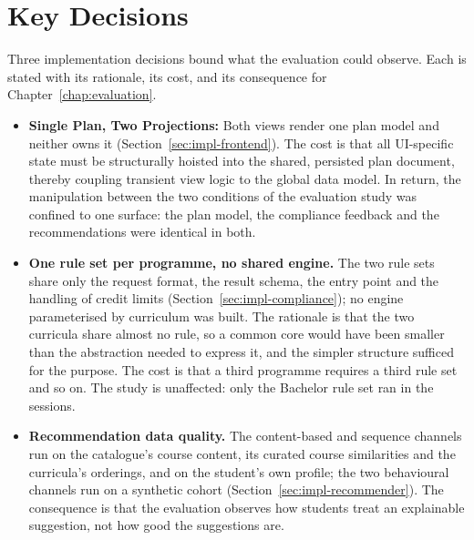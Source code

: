 \section{Key Decisions}
\label{sec:impl-decisions}
Three implementation decisions bound what the evaluation could observe. Each is stated with its rationale, its cost, and its consequence for Chapter~\ref{chap:evaluation}.
\begin{itemize}
    \item \textbf{Single Plan, Two Projections:} Both views render one plan model and neither owns it (Section~\ref{sec:impl-frontend}). The cost is that all UI-specific state must be structurally hoisted into the shared, persisted plan document, thereby coupling transient view logic to the global data model. In return, the manipulation between the two conditions of the evaluation study was confined to one surface: the plan model, the compliance feedback and the recommendations were identical in both.
    \item \textbf{One rule set per programme, no shared engine.} The two rule sets share only the request format, the result schema, the entry point and the handling of credit limits (Section~\ref{sec:impl-compliance}); no engine parameterised by curriculum was built. The rationale is that the two curricula share almost no rule, so a common core would have been smaller than the abstraction needed to express it, and the simpler structure sufficed for the purpose. The cost is that a third programme requires a third rule set and so on. The study is unaffected: only the Bachelor rule set ran in the sessions.
    \item \textbf{Recommendation data quality.} The content-based and sequence channels run on the catalogue's course content, its curated course similarities and the curricula's orderings, and on the student's own profile; the two behavioural channels run on a synthetic cohort (Section~\ref{sec:impl-recommender}). The consequence is that the evaluation observes how students treat an explainable suggestion, not how good the suggestions are.
\end{itemize}



